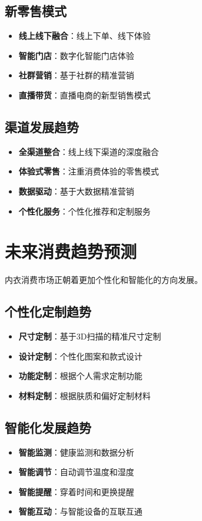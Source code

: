 \documentclass[12pt,UTF8]{ctexbook}
\begin{document}
\subsection{新零售模式}
\begin{itemize}[leftmargin=2cm]
	\item \textbf{线上线下融合}：线上下单、线下体验
	\item \textbf{智能门店}：数字化智能门店体验
	\item \textbf{社群营销}：基于社群的精准营销
	\item \textbf{直播带货}：直播电商的新型销售模式
\end{itemize}

\subsection{渠道发展趋势}
\begin{itemize}[leftmargin=2cm]
	\item \textbf{全渠道整合}：线上线下渠道的深度融合
	\item \textbf{体验式零售}：注重消费体验的零售模式
	\item \textbf{数据驱动}：基于大数据精准营销
	\item \textbf{个性化服务}：个性化推荐和定制服务
\end{itemize}

\section{未来消费趋势预测}
内衣消费市场正朝着更加个性化和智能化的方向发展。

\subsection{个性化定制趋势}
\begin{itemize}[leftmargin=2cm]
	\item \textbf{尺寸定制}：基于3D扫描的精准尺寸定制
	\item \textbf{设计定制}：个性化图案和款式设计
	\item \textbf{功能定制}：根据个人需求定制功能
	\item \textbf{材料定制}：根据肤质和偏好定制材料
\end{itemize}

\subsection{智能化发展趋势}
\begin{itemize}[leftmargin=2cm]
	\item \textbf{智能监测}：健康监测和数据分析
	\item \textbf{智能调节}：自动调节温度和湿度
	\item \textbf{智能提醒}：穿着时间和更换提醒
	\item \textbf{智能互动}：与智能设备的互联互通
\end{itemize}
\end{document}
